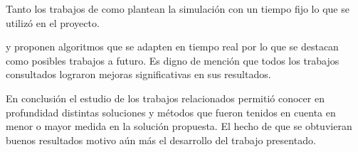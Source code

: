 Tanto los trabajos de \citet{Teo2010} como \citet{Stolfi2012} plantean la simulación con un tiempo fijo lo que se utilizó en el proyecto.

\citet{Montana1996} y \citet{Vogel2000}  proponen algoritmos que se adapten en tiempo real por lo que se destacan como posibles trabajos a futuro.
Es digno de mención que todos los trabajos consultados lograron mejoras significativas en sus resultados.

En conclusión el estudio de los trabajos relacionados permitió conocer en profundidad distintas soluciones y métodos que fueron tenidos en cuenta en menor o mayor medida en la solución propuesta. El hecho de que se obtuvieran buenos resultados motivo aún más el desarrollo del trabajo presentado.





